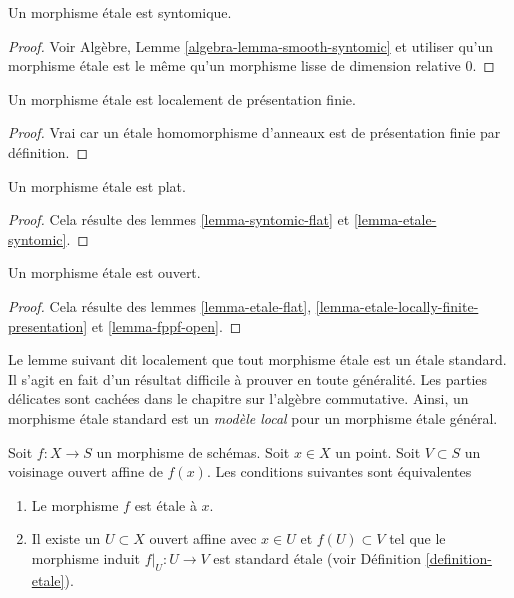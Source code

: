 \begin{lemma}
\label{lemma-etale-syntomic}
Un morphisme étale est syntomique.
\end{lemma}

\begin{proof}
Voir Algèbre, Lemme \ref{algebra-lemma-smooth-syntomic} et utiliser qu'un morphisme
étale est le même qu'un morphisme lisse de dimension relative $0$.
\end{proof}

\begin{lemma}
\label{lemma-etale-locally-finite-presentation}
Un morphisme étale est localement de présentation finie.
\end{lemma}

\begin{proof}
Vrai car un étale homomorphisme d'anneaux est de présentation finie par
définition.
\end{proof}

\begin{lemma}
\label{lemma-etale-flat}
Un morphisme étale est plat.
\end{lemma}

\begin{proof}
Cela résulte des lemmes \ref{lemma-syntomic-flat} et \ref{lemma-etale-syntomic}.
\end{proof}

\begin{lemma}
\label{lemma-etale-open}
Un morphisme étale est ouvert.
\end{lemma}

\begin{proof}
Cela résulte des lemmes \ref{lemma-etale-flat},
\ref{lemma-etale-locally-finite-presentation} et
\ref{lemma-fppf-open}.
\end{proof}

\noindent
Le lemme suivant dit localement que tout morphisme étale est un étale standard.
Il s’agit en fait d’un résultat difficile à prouver en toute généralité. Les parties délicates
sont cachées dans le chapitre sur l'algèbre commutative. Ainsi, un morphisme
étale standard est un {\it modèle local} pour un morphisme
étale général.

\begin{lemma}
\label{lemma-etale-locally-standard-etale}
Soit $f : X  \to S$ un morphisme de schémas. Soit $x \in X$
un point. Soit $V \subset S$
un voisinage ouvert affine de $f(x)$. Les conditions
suivantes sont équivalentes
\begin{enumerate}
\item Le morphisme $f$ est étale à $x$.
\item Il existe un $U \subset X$ ouvert affine avec
$x \in U$ et $f(U) \subset V$ tel que le morphisme
induit $f|_U : U \to V$ est standard étale
(voir Définition \ref{definition-etale}).
\end{enumerate}
\end{lemma}

